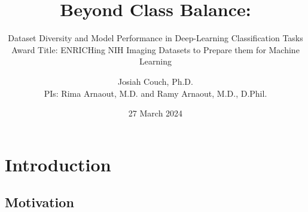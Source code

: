 \documentclass[8pt,aspectratio=169]{beamer}
\title{Beyond Class Balance:}
\subtitle{
    Dataset Diversity and Model Performance in Deep-Learning Classification Tasks
    \\
    Award Title: ENRICHing NIH Imaging Datasets to Prepare them for Machine Learning
    }
\institute{
    Beth Israel Deaconess Medical Center\\
}
\author{
    Josiah Couch, Ph.D.\\
    PIs: Rima Arnaout, M.D. and Ramy Arnaout, M.D., D.Phil.
    }
\date{27 March 2024}
\begin{document}
\begin{frame}
\titlepage
\end{frame}


\section{Introduction}


\subsection{Motivation}
\end{document}

